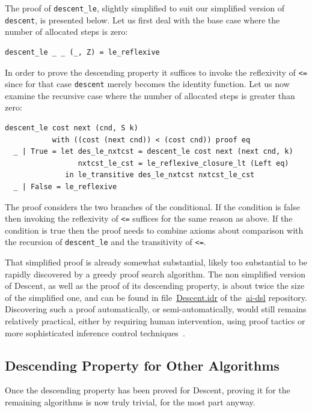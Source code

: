 \documentclass[]{report}
\begin{document}
The proof of \texttt{descent\_le}, slightly simplified to suit our
simplified version of \texttt{descent}, is presented below.  Let us
first deal with the base case where the number of allocated steps is
zero:
\begin{verbatim}
descent_le _ _ (_, Z) = le_reflexive
\end{verbatim}
In order to prove the descending property it suffices to invoke the
reflexivity of \texttt{<=} since for that case \texttt{descent} merely
becomes the identity function.  Let us now examine the recursive case
where the number of allocated steps is greater than zero:
\begin{verbatim}
descent_le cost next (cnd, S k)
           with ((cost (next cnd)) < (cost cnd)) proof eq
  _ | True = let des_le_nxtcst = descent_le cost next (next cnd, k)
                 nxtcst_le_cst = le_reflexive_closure_lt (Left eq)
              in le_transitive des_le_nxtcst nxtcst_le_cst
  _ | False = le_reflexive
\end{verbatim}
The proof considers the two branches of the conditional.  If the
condition is false then invoking the reflexivity of \texttt{<=}
suffices for the same reason as above.  If the condition is true then
the proof needs to combine axioms about comparison with the recursion
of \texttt{descent\_le} and the transitivity of \texttt{<=}.

That simplified proof is already somewhat substantial, likely too
substantial to be rapidly discovered by a greedy proof search
algorithm.  The non simplified version of Descent, as well as the
proof of its descending property, is about twice the size of the
simplified one, and can be found in
file~\href{https://github.com/singnet/ai-dsl/blob/master/experimental/ai-algorithms/descent/Search/Descent.idr}{Descent.idr}
of the~\href{https://github.com/singnet/ai-dsl}{ai-dsl} repository.
Discovering such a proof automatically, or semi-automatically, would
still remains relatively practical, either by requiring human
intervention, using proof tactics or more sophisticated inference
control techniques~\cite{Goertzel2014EGI2Chapt18}.

\subsection{Descending Property for Other Algorithms}
Once the descending property has been proved for Descent, proving it
for the remaining algorithms is now truly trivial, for the most part
anyway.
\end{document}
